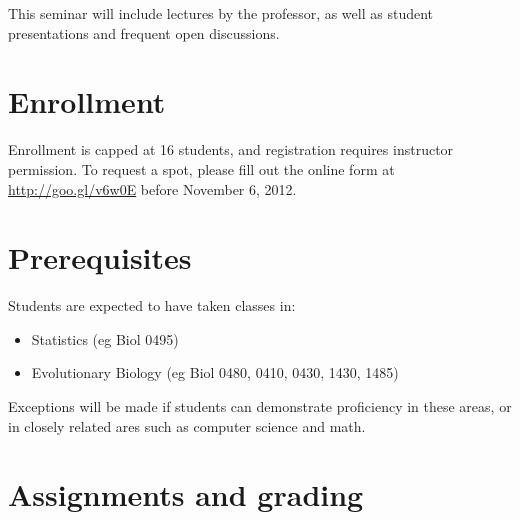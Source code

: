 \documentclass[12pt]{article}
\begin{document}
This seminar will include lectures by the professor, as well as student presentations and frequent open discussions.

\section*{Enrollment}
Enrollment is capped at 16 students, and registration requires instructor permission. To request a spot, please fill out the online form at \url{http://goo.gl/v6w0E} before November 6, 2012.


\section*{Prerequisites} 
Students are expected to have taken classes in:

\begin{itemize}


\item Statistics (eg Biol 0495)
\item Evolutionary Biology (eg Biol 0480, 0410, 0430,  1430, 1485)

\end{itemize}

Exceptions will be made if students can demonstrate proficiency in these areas, or in closely related ares such as computer science and math.

\section*{Assignments and grading}
\end{document}
